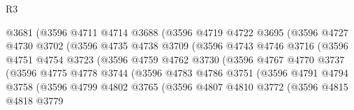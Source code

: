 \begin{lexlean}{R3}
\begin{coremodule}
                          @3681
                          (@3596
                            @4711
                            @4714
                            @3688
                            (@3596
                              @4719
                              @4722
                              @3695
                              (@3596
                                @4727
                                @4730
                                @3702
                                (@3596
                                  @4735
                                  @4738
                                  @3709
                                  (@3596
                                    @4743
                                    @4746
                                    @3716
                                    (@3596
                                      @4751
                                      @4754
                                      @3723
                                      (@3596
                                        @4759
                                        @4762
                                        @3730
                                        (@3596
                                          @4767
                                          @4770
                                          @3737
                                          (@3596
                                            @4775
                                            @4778
                                            @3744
                                            (@3596
                                              @4783
                                              @4786
                                              @3751
                                              (@3596
                                                @4791
                                                @4794
                                                @3758
                                                (@3596
                                                  @4799
                                                  @4802
                                                  @3765
                                                  (@3596
                                                    @4807
                                                    @4810
                                                    @3772
                                                    (@3596
                                                      @4815
                                                      @4818
                                                      @3779

\end{coremodule}
\end{lexlean}
